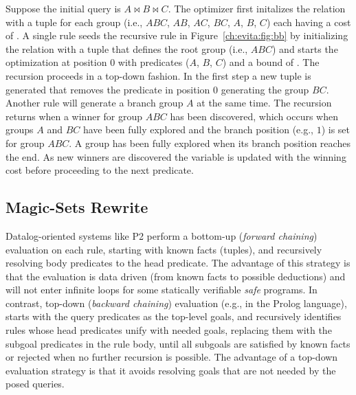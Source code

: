 Suppose the initial query is $A \Join B \Join C$. The optimizer first initalizes the  relation
with a tuple for each group (i.e., $ABC$, $AB$, $AC$, $BC$, $A$, $B$, $C$) each having a cost
of . A single rule seeds the recursive rule  in Figure~\ref{ch:evita:fig:bb} by initializing
the  relation with a tuple that defines the root group (i.e., $ABC$) and starts the optimization
at position $0$ with predicates ($A$, $B$, $C$) and a bound of . The recursion proceeds in a
top-down fashion. In the first step a new  tuple is generated that removes the predicate in position $0$
generating the group $BC$. Another rule will generate a branch group $A$ at the same time. The recursion returns
when a winner for group $ABC$ has been discovered, which occurs when groups $A$ and $BC$ have been fully
explored and the  branch position (e.g., $1$) is set for group $ABC$. A group has been fully explored when its 
branch position reaches the end. As new winners are discovered the  variable is updated with the
winning cost before proceeding to the next predicate. 

\subsection{Magic-Sets Rewrite}
\label{ch:evita:sec:magic}

Datalog-oriented systems like P2 perform a bottom-up (\emph{forward chaining}) evaluation 
on each rule, starting with known facts (tuples), and recursively resolving body predicates to the 
head predicate. The advantage of this strategy is that the evaluation is data driven (from known facts 
to possible deductions) and will not enter infinite loops for some statically verifiable \emph{safe} programs. 
In contrast, top-down (\emph{backward chaining}) evaluation (e.g., in the Prolog language), 
starts with the query predicates as the top-level goals, and recursively identifies rules whose head predicates 
unify with needed goals, replacing them with the subgoal predicates in the rule body, until all subgoals are 
satisfied by known facts or rejected when no further recursion is possible. The advantage of a top-down evaluation 
strategy is that it avoids resolving goals that are not needed by the posed queries.

